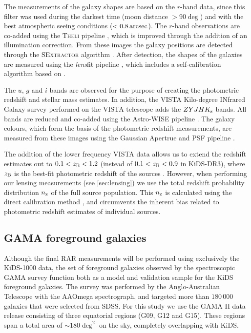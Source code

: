\documentclass[fleqn,usenatbib]{mnras}
\newcommand{\as}{\, {\rm arcsec}}
\newcommand{\un}[1]{_{\rm #1}}
\begin{document}
The measurements of the galaxy shapes are based on the $r$-band data, since this filter was used during the darkest time (moon distance $> 90 \deg$) and with the best atmospheric seeing conditions ($<0.8 \as$). The $r$-band observations are co-added using the {\scshape Theli} pipeline \cite[]{erben2013}, which is improved through the addition of an illumination correction. From these images the galaxy positions are detected through the {\scshape SExtractor} algorithm \cite[]{bertin1996}. After detection, the shapes of the galaxies are measured using the \emph{lens}fit pipeline \cite[]{miller2007,miller2013}, which includes a self-calibration algorithm based on \cite{fenechconti2017}.

The $u$, $g$ and $i$ bands are observed for the purpose of creating the photometric redshift and stellar mass estimates. In addition, the  VISTA Kilo-degree INfrared Galaxy survey \cite[VIKING,][]{edge2013} performed on the VISTA telescope adds the $ZYJHK_{\rm s}$ bands. All bands are reduced and co-added using the Astro-WISE pipeline \cite[]{mcfarland2013}. The galaxy colours, which form the basis of the photometric redshift measurements, are measured from these images using the Gaussian Apertrue and PSF pipeline \cite[GAaP][]{kuijken2008,kuijken2015}.

The addition of the lower frequency VISTA data allows us to extend the redshift estimates out to $0.1<z\un{B}<1.2$ (instead of $0.1<z\un{B}<0.9$ in KiDS-DR3), where $z\un{B}$ is the best-fit photometric redshift of the sources \cite[]{benitez2000,hildebrandt2012}. However, when performing our lensing measurements (see \ref{sec:lensing}) we use the total redshift probability distribution $n\un{z}$ of the full source population. This $n\un{z}$ is calculated using the direct calibration method \cite[DIR,][]{hildebrandt2017}, and circumvents the inherent bias related to photometric redshift estimates of individual sources.

\subsection{GAMA foreground galaxies}
\label{sec:gama}

Although the final RAR measurements will be performed using exclusively the KiDS-1000 data, the set of foreground galaxies observed by the spectroscopic GAMA survey \cite[]{driver2011} function both as a model and validation sample for the KiDS foreground galaxies. The survey was performed by the Anglo-Australian Telescope with the AAOmega spectrograph, and targeted more than $180 \, 000$ galaxies that were selected from SDSS. For this study we use the GAMA II data release \cite[]{liske2015} consisting of three equatorial regions (G09, G12 and G15). These regions span a total area of $\sim180 \deg^2$ on the sky, completely overlapping with KiDS.
\end{document}

